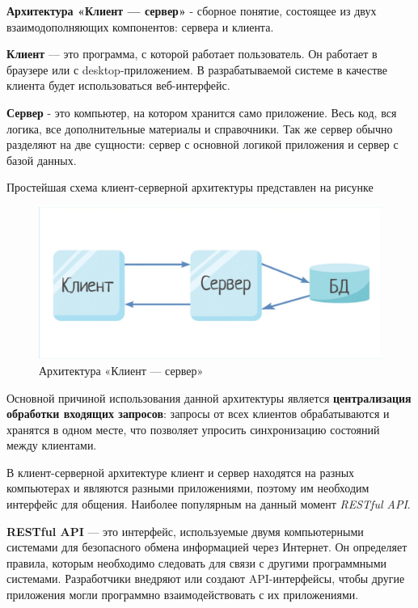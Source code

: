 \textbf{Архитектура «Клиент — сервер»} - сборное понятие, состоящее из двух взаимодополняющих компонентов: сервера и клиента.

\textbf{Клиент} — это программа, с которой работает пользователь. Он работает в браузере или с desktop-приложением. В разрабатываемой системе в качестве клиента будет использоваться веб-интерфейс.

\textbf{Сервер} - это компьютер, на котором хранится само приложение. Весь код, вся логика, все дополнительные материалы и справочники. Так же сервер обычно разделяют на две сущности: сервер с основной логикой приложения и сервер с базой данных. 

Простейшая схема клиент-серверной архитектуры представлен на рисунке 

\begin{figure}[ht!] 
\center
\includegraphics [scale=0.4] {my_folder/images//client-server-arch}
\caption{Архитектура «Клиент — сервер»} 
\label{fig:client-server-arch}  
\end{figure}

Основной причиной использования данной архитектуры является \textbf{централизация обработки входящих запросов}: запросы от всех клиентов обрабатываются и хранятся в одном месте, что позволяет упросить синхронизацию состояний между клиентами. 

В клиент-серверной архитектуре клиент и сервер находятся на разных компьютерах и являются разными приложениями, поэтому им необходим интерфейс для общения. Наиболее популярным на данный момент \textit{RESTful API}. 

\textbf{RESTful API}\cite{restful-api-post} — это интерфейс, используемые двумя компьютерными системами для безопасного обмена информацией через Интернет. Он определяет правила, которым необходимо следовать для связи с другими программными системами. Разработчики внедряют или создают API-интерфейсы, чтобы другие приложения могли программно взаимодействовать с их приложениями. 

